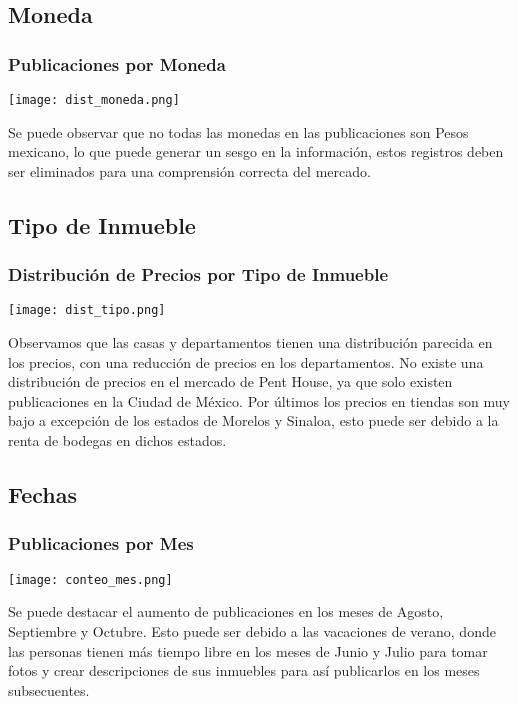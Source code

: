\documentclass{report}
\begin{document}
\subsection{Moneda}
\subsubsection{Publicaciones por Moneda}
\begin{center}
\texttt{[image: dist\_moneda.png]}
\end{center}
Se puede observar que no todas las monedas en las publicaciones son Pesos mexicano, lo que puede generar un sesgo en la información, estos registros deben ser eliminados para una comprensión correcta del mercado.

\subsection{Tipo de Inmueble}
\subsubsection{Distribución de Precios por Tipo de Inmueble}
\begin{center}
\texttt{[image: dist\_tipo.png]}
\end{center}
Observamos que las casas y departamentos tienen una distribución parecida en los precios, con una reducción de precios en los departamentos. No existe una distribución de precios en el mercado de Pent House, ya que solo existen publicaciones en la Ciudad de México. Por últimos los precios en tiendas son muy bajo a excepción de los estados de Morelos y Sinaloa, esto puede ser debido a la renta de bodegas en dichos estados.

\subsection{Fechas}
\subsubsection{Publicaciones por Mes}
\begin{center}
\texttt{[image: conteo\_mes.png]}
\end{center}
Se puede destacar el aumento de publicaciones en los meses de Agosto, Septiembre y Octubre. Esto puede ser debido a las vacaciones de verano, donde las personas tienen más tiempo libre en los meses de Junio y Julio para tomar fotos y crear descripciones de sus inmuebles para así publicarlos en los meses subsecuentes.
\end{document}
